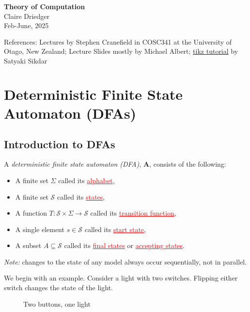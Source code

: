 \documentclass[11pt]{article}
\newcommand{\defn}[0]{\tcbhighmath[boxrule=0.5mm, colframe=cyan!20, colback=cyan!20, arc=10mm, size=fbox]{\textbf{DEF:}}}
\newcommand{\ex}[0]{\tcbhighmath[boxrule=0.5mm, colframe=pink, colback=pink, arc=10mm, size=fbox]{\textbf{Ex:}}}
\begin{document}
\begin{center}
    {\LARGE \textbf{Theory of Computation}} \\[0.5em]
    {\large Claire Driedger} \\[0.3em]
    {\normalsize Feb-June, 2025}
\end{center}
\noindent
\colorbox{gray!20}{%
  \parbox{\textwidth}{%
    References: Lectures by Stephen Cranefield in COSC341 at the University of Otago, New Zealand; Lecture Slides mostly by Michael Albert; \href{https://www3.nd.edu/~kogge/courses/cse30151-fa17/Public/other/tikz_tutorial.pdf}{tikz tutorial} by Satyaki Sikdar
  }
}

\tableofcontents
\newpage

\section{Deterministic Finite State Automaton (DFAs)}

\subsection{Introduction to DFAs}

\defn A \textit{deterministic finite state automaton (DFA)}, \textbf{A}, consists of the following:
\begin{itemize}[itemsep=-2pt]\setlength{\baselineskip}{10pt}
    \item A finite set $\Sigma$ called its \textcolor{red}{\underline{alphabet}},
    \item A finite set $\mathcal{S}$ called its \textcolor{red}{\underline{states}},
    \item A function $T :\mathcal{S} \times \Sigma \to \mathcal{S}$ called its \textcolor{red}{\underline{transition function}},
    \item A single element $s \in \mathcal{S}$ called its \textcolor{red}{\underline{start state}},
    \item A subset $A \subseteq \mathcal{S}$ called its \textcolor{red}{\underline{final states}} or \textcolor{red}{\underline{accepting states}}.
\end{itemize}
\textit{Note:} changes to the state of any model always occur sequentially, not in parallel.

We begin with an example. Consider a light with two switches. Flipping either switch changes the state of the light.\\

\quad\quad \ex 
\begin{figure}[ht] %
\centering %
\caption{Two buttons, one light}
\label{fig:2b1l}
\end{figure}
\end{document}
